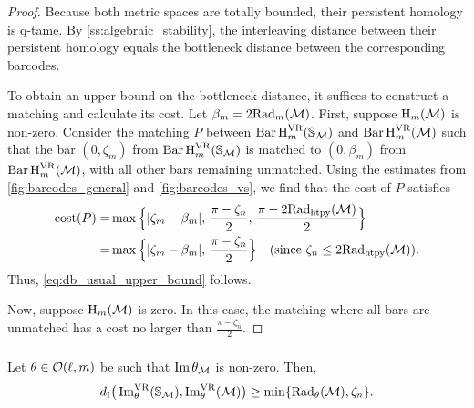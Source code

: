 \begin{proof}
	Because both metric spaces are totally bounded, their persistent homology is q-tame.
	By \cref{ss:algebraic_stability}, the interleaving distance between their persistent homology equals the bottleneck distance between the corresponding barcodes.

	To obtain an upper bound on the bottleneck distance, it suffices to construct a matching and calculate its cost.
	Let \(\beta_m = 2\firstdeath{m}{\cM}\).
	First, suppose \(\opH_m(\cM)\) is non-zero.
	Consider the matching \(P\) between \(\Hbarc[\field]{m}{\bS_{\cM}}\) and \(\Hbarc[\field]{m}{\cM}\) such that the bar \((0, \zeta_m)\) from \(\Hbarc[\field]{m}{\bS_{\cM}}\) is matched to \((0, \beta_m)\) from \(\Hbarc[\field]{m}{\cM}\), with all other bars remaining unmatched. Using the estimates from \cref{fig:barcodes_general} and \cref{fig:barcodes_vs}, we find that the cost of \(P\) satisfies
	\begin{align*}
		\cost(P)
		= & \max\Big\{|\zeta_m - \beta_m|,\, \frac{\pi - \zeta_n}{2},\, \frac{\pi - 2\crit(\cM)}{2}\Big\} \\
		= & \max\Big\{|\zeta_m - \beta_m|,\, \frac{\pi - \zeta_n}{2}\Big\} \quad \text{(since \(\zeta_n \leq 2\crit(\cM)\))}.
	\end{align*}
	Thus, \cref{eq:db_usual_upper_bound} follows.

	Now, suppose \(\opH_m(\cM)\) is zero. In this case, the matching where all bars are unmatched has a cost no larger than \(\frac{\pi - \zeta_n}{2}\).
\end{proof}

\subsubsection{}\label{sss:db_theta_lower_bound}

\lemma
Let $\theta \in \cO(\ell, m)$ be such that $\img \theta_\cM$ is non-zero.
Then,
\begin{equation}\label{eq:db_theta_lower_bound}
	\di\big(\img^{\VR}_{\theta}(\bS_{\cM}), \img^{\VR}_{\theta}(\cM)\big)
	\geq \min\{\firstdeath{\theta}{\cM}, \zeta_n\}.
\end{equation}

